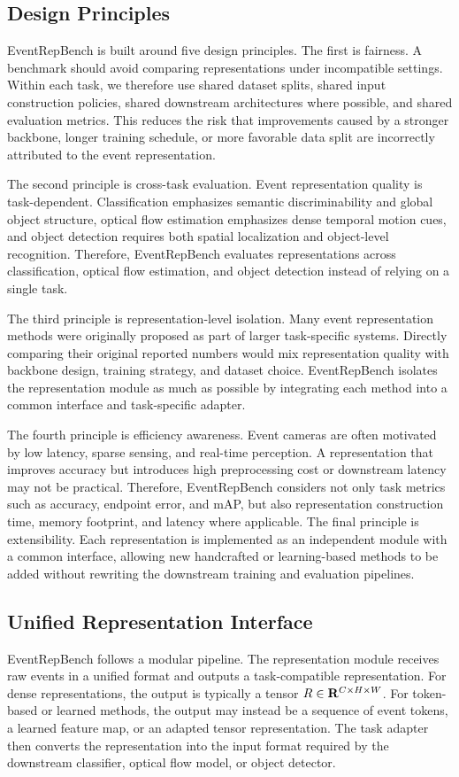 \documentclass[letterpaper]{article}
\begin{document}
\subsection{Design Principles}
EventRepBench is built around five design principles. The first is fairness. A benchmark should avoid comparing representations under incompatible settings. Within each task, we therefore use shared dataset splits, shared input construction policies, shared downstream architectures where possible, and shared evaluation metrics. This reduces the risk that improvements caused by a stronger backbone, longer training schedule, or more favorable data split are incorrectly attributed to the event representation.

The second principle is cross-task evaluation. Event representation quality is task-dependent. Classification emphasizes semantic discriminability and global object structure, optical flow estimation emphasizes dense temporal motion cues, and object detection requires both spatial localization and object-level recognition. Therefore, EventRepBench evaluates representations across classification, optical flow estimation, and object detection instead of relying on a single task.

The third principle is representation-level isolation. Many event representation methods were originally proposed as part of larger task-specific systems. Directly comparing their original reported numbers would mix representation quality with backbone design, training strategy, and dataset choice. EventRepBench isolates the representation module as much as possible by integrating each method into a common interface and task-specific adapter.

The fourth principle is efficiency awareness. Event cameras are often motivated by low latency, sparse sensing, and real-time perception. A representation that improves accuracy but introduces high preprocessing cost or downstream latency may not be practical. Therefore, EventRepBench considers not only task metrics such as accuracy, endpoint error, and mAP, but also representation construction time, memory footprint, and latency where applicable. The final principle is extensibility. Each representation is implemented as an independent module with a common interface, allowing new handcrafted or learning-based methods to be added without rewriting the downstream training and evaluation pipelines.

\subsection{Unified Representation Interface}
EventRepBench follows a modular pipeline. The representation module receives raw events in a unified format and outputs a task-compatible representation. For dense representations, the output is typically a tensor $R\in{\bf R}^{C\times H\times W}$. For token-based or learned methods, the output may instead be a sequence of event tokens, a learned feature map, or an adapted tensor representation. The task adapter then converts the representation into the input format required by the downstream classifier, optical flow model, or object detector.
\end{document}
